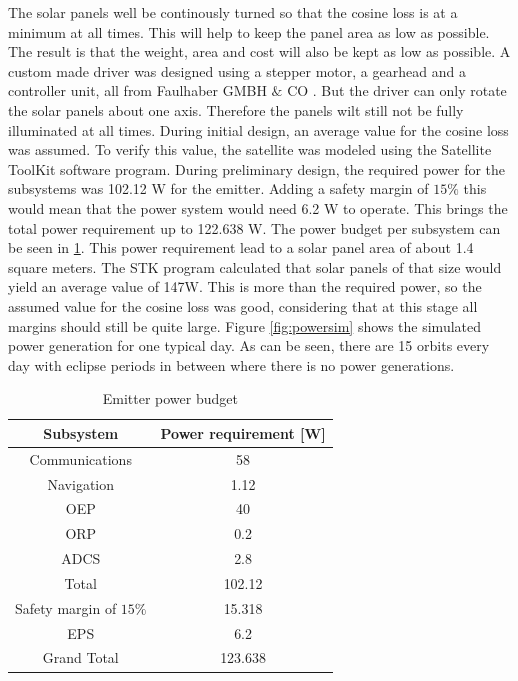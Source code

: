 The solar panels well be continously turned so that the cosine loss is at a minimum at all times. This will help to keep the panel area as low as possible. The result is that the weight, area and cost will also be kept as low as possible. A custom made driver was designed using a stepper motor, a gearhead and a controller unit, all from Faulhaber GMBH $\&$ CO \cite{faulhaber}. But the driver can only rotate the solar panels about one axis. Therefore the panels wilt still not be fully illuminated at all times. During initial design, an average value for the cosine loss was assumed. To verify this value, the satellite was modeled using the Satellite ToolKit software program. During preliminary design, the required power for the subsystems was 102.12 W for the emitter. Adding a safety margin of $15\%$ this would mean that the power system would need 6.2 W to operate. This brings the total power requirement up to 122.638 W. The power budget per subsystem can be seen in \ref{tab:emitterPowerBudget}. This power requirement lead to a solar panel area of about 1.4 square meters. The STK program calculated that solar panels of that size would yield an average value of 147W. This is more than the required power, so the assumed value for the cosine loss was good, considering that at this stage all margins should still be quite large.  Figure \ref{fig:powersim} shows the simulated power generation for one typical day. As can be seen, there are 15 orbits every day with eclipse periods in between where there is no power generations.

\begin{table}
\centering
\begin{tabular}{cc}
\toprule
Subsystem & Power requirement [W]\\
\midrule
Communications & 58\\
Navigation & 1.12\\
OEP & 40\\
ORP & 0.2\\
ADCS & 2.8\\
\midrule
Total & 102.12\\
Safety margin of $15\%$ & 15.318\\
EPS & 6.2\\
\midrule
\midrule
Grand Total & 123.638\\
\bottomrule
\end{tabular}
\caption{Emitter power budget}
\label{tab:emitterPowerBudget}
\end{table}


